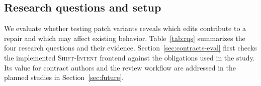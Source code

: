 \documentclass[a4paper,fleqn]{cas-sc}
\newcommand{\dsl}{\textsc{Shift-Intent}}
\newcommand{\lab}[1]{\textsf{#1}}
\begin{document}





\subsection{Research questions and setup}\label{sec:setup}

We evaluate whether testing patch variants reveals which edits contribute to a repair and which may affect existing behavior. Table~\ref{tab:rqs} summarizes the four research questions and their evidence. Section~\ref{sec:contracts-eval} first checks the implemented \dsl{} frontend against the obligations used in the study. Its value for contract authors and the review workflow are addressed in the planned studies in Section~\ref{sec:future}.
\end{document}
